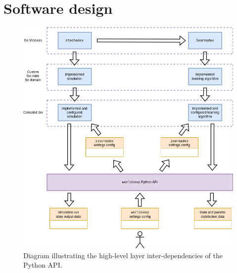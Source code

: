 \section{\sffamily Software design}

\begin{figure}[h]
\centering
\includegraphics[width=12cm]{images/chapter-5-high-level-dependencies.drawio.png}
\caption{Diagram illustrating the high-level layer inter-dependencies of the Python API.}
\label{fig:high-level-api-dependencies}
\end{figure}